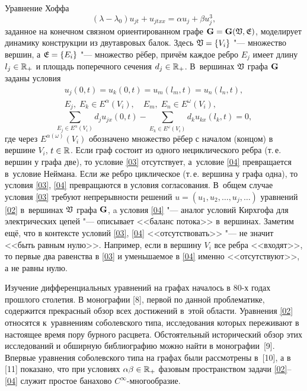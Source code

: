 Уравнение Хоффа
\begin{equation}
\label{02}(\lambda -\lambda_0)u_{jt}+u_{jtxx}=\alpha u_j+ \beta u_j^3,
\end{equation}
заданное на конечном связном ориентированном графе ${\bf G}={\bf G} (\frak V, \frak E)$,
моделирует динамику конструкции из двутавровых балок. 
Здесь $\frak V=\{V_i\}$ "--- множество вершин, а $\frak E=\{E_i\}$ "--- множество рёбер, причём каждое ребро $E_j$ имеет длину $l_j\in\Bbb R_+$ и площадь поперечного сечения $d_j\in\Bbb R_+$. 
В~вершинах $\frak V$ графа $\bf G$ заданы условия
\begin{equation}
\begin{array}{c}
\label{03}u_j (0, t)=u_k (0, t)=u_m (l_m, t)=u_n (l_n, t),\\
 E_j,\; E_k\in E^\alpha (V_i), \quad  E_m, \;E_n\in E^\omega (V_i),
\end{array}
\end{equation} \begin{equation}
\label{04}\sum_{E_j\in E^\alpha (V_i)} d_ju_{jx} (0, t)- \!\!\! \!\!\! \sum_{E_k\in E^\omega (V_i)} d_ku_{kx} (l_k, t)=0, 
\end{equation} где через $E^{\alpha(\omega)}(V_i)$ обозначено множество  рёбер  с началом (концом) в вершине $V_i$, $t\in\Bbb R$. 
Если граф состоит из одного нециклического ребра (т.\,е. вершин у графа две), то условие \eqref{03} отсутствует, а~условие \eqref{04} превращается в~условие Неймана. 
Если же ребро циклическое (т.\,е.  вершина у графа одна), то условия \eqref{03}, \eqref{04} превращаются в условия согласования. 
В~общем случае условия \eqref{03} требуют непрерывности решений $u=(u_1, u_2, \ldots, u_j, \ldots)$ уравнений \eqref{02} в~вершинах $\frak V$ графа $\bf G$, a условия \eqref{04} "--- аналог условий Кирхгофа для электрических цепей "--- описывает <<баланс потока>> в~вершинах. 
Заметим ещё, что в контексте условий \eqref{03}, \eqref{04} <<отсутствовать>> "--- не значит <<быть равным нулю>>. 
Например, если в вершину $V_i$ все ребра <<входят>>, то первые два равенства в \eqref{03} и уменьшаемое в \eqref{04} именно <<отсутствуют>>, а не равны нулю.

Изучение дифференциальных уравнений на графах началось в 80-х годах прошлого столетия. 
В монографии [8], первой  по данной    проблематике, содержится прекрасный обзор всех достижений в~этой области. 
Уравнения \eqref{02} относятся к~уравнениям соболевского типа, исследования которых переживают в настоящее время пору бурного расцвета. 
Обстоятельный исторический обзор этих исследований и обширную библиографию можно найти в монографии~[9]. 
Впервые уравнения соболевского типа на графах были рассмотрены в~[10], а в [11]  показано, что при условиях $\alpha\beta\in\Bbb R_+$ фазовым пространством задачи \eqref{02}--\eqref{04} служит простое банахово $C^\infty$-многообразие.


